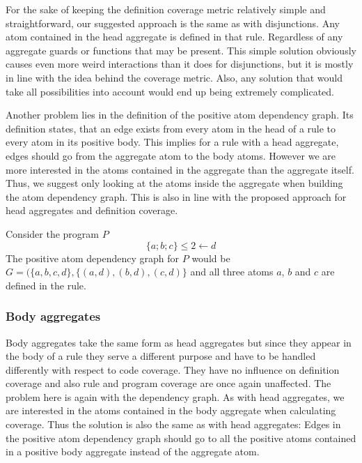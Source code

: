 For the sake of keeping the definition coverage metric relatively simple and straightforward, our suggested approach is the same as with disjunctions. Any atom contained in the head aggregate is defined in that rule. Regardless of any aggregate guards or functions that may be present. This simple solution obviously causes even more weird interactions than it does for disjunctions, but it is mostly in line with the idea behind the coverage metric. Also, any solution that would take all possibilities into account would end up being extremely complicated.

Another problem lies in the definition of the positive atom dependency graph. Its definition states, that an edge exists from every atom in the head of a rule to every atom in its positive body. This implies for a rule with a head aggregate, edges should go from the aggregate atom to the body atoms. However we are more interested in the atoms contained in the aggregate than the aggregate itself. Thus, we suggest only looking at the atoms inside the aggregate when building the atom dependency graph. This is also in line with the proposed approach for head aggregates and definition coverage.

\begin{example}
\label{ex:head aggregates}
    Consider the program $P$
    \[
        \{a ; b ; c\} \leq 2 \leftarrow d
    \]
    The positive atom dependency graph for $P$ would be \(G = (\{a, b, c, d\}, \{(a, d), (b, d), (c, d)\}\) and all three atoms $a$, $b$ and $c$ are defined in the rule.
\end{example}

\subsubsection{Body aggregates}
\label{subsubsec:Coverage for further program classes/Language constructs/Body aggregates}
Body aggregates take the same form as head aggregates but since they appear in the body of a rule they serve a different purpose and have to be handled differently with respect to code coverage. They have no influence on definition coverage and also rule and program coverage are once again unaffected. The problem here is again with the dependency graph. As with head aggregates, we are interested in the atoms contained in the body aggregate when calculating coverage. Thus the solution is also the same as with head aggregates: Edges in the positive atom dependency graph should go to all the positive atoms contained in a positive body aggregate instead of the aggregate atom.

